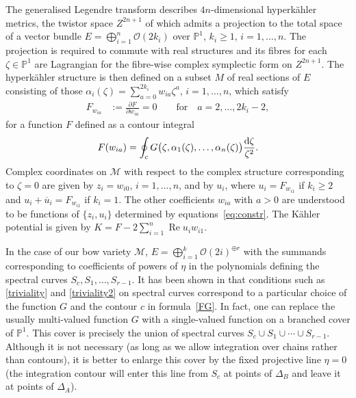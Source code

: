 \documentclass[10pt,a4paper]{amsart}
\newcommand{\re}{\operatorname{Re}}
\newcommand{\ol}{\overline}
\numberwithin{equation}{section}
\newcommand{\oP}{{\mathbb{P}}}
\newcommand{\sM}{{\mathcal{M}}} %
\newcommand{\sO}{{\mathcal{O}}}
\begin{document}
{ The generalised Legendre transform describes $4n$-dimensional hyperk\"ahler metrics, the twistor space $Z^{2n+1}$ of which admits a projection to the total space of a vector bundle $E=\bigoplus_{i=1}^n\sO(2k_i)$ over $\oP^1$, $k_i\geq 1$, $i=1,\dots,n$. The projection is required to commute with real structures and its fibres for each $\zeta\in \oP^1$ are Lagrangian for the fibre-wise complex symplectic form on $Z^{2n+1}$. The hyperk\"ahler structure is then defined on a subset $M$ of real sections of $E$ consisting of those $\alpha_i(\zeta)=\sum_{a=0}^{2k_i}w_{ia}\zeta^a$, $i=1,\dots, n$, which satisfy
 \begin{align}\label{eq:constr}
 F_{w_{ia}}&:=\frac{\partial F}{\partial w_{ia}}=0\qquad \text{for}\quad a=2,\dots, 2k_i-2,
 \end{align}
 for a function $F$ defined as a contour integral
 \begin{equation}
 F(w_{ia})=\oint_c G\bigl(\zeta,\alpha_1(\zeta),\dots,\alpha_n(\zeta)\bigr) \frac{{\rm d}\zeta}{\zeta^2}.\label{FG}
 \end{equation}
 Complex coordinates on $\sM$ with respect to the complex structure corresponding to $\zeta=0$ are given by $z_i=w_{i0}$, $i=1,\dots, n$, and by $u_i$, where $ u_i=F_{w_{i1}}$ if $k_i\geq 2$ and $u_i+\ol u_i=F_{w_{i1}}$ if $k_i=1$.
The other coefficients $w_{ia}$ with $a>0$ are understood to be functions of $\{z_i, u_i\}$ determined by equations~\eqref{eq:constr}.
The K\"ahler potential is given by $K=F-2\sum_{i=1}^n\re u_iw_{i1}$.

 In the case of our bow variety $\sM$, $E=\bigoplus_{i=1}^k \sO(2i)^{\oplus r}$ with the summands corresponding to coefficients of powers of $\eta$ in the polynomials defining the spectral curves $S_c,S_1,\dots,S_{r-1}$.
 It has been shown in \cite{BielGZ} that conditions such as \eqref{triviality} and
 \eqref{triviality2} on spectral curves correspond to a particular choice of the function $G$ and the contour $c$ in formula~\eqref{FG}.
 In fact, one can replace the usually multi-valued function $G$ with a single-valued function on a branched cover of $\oP^1$. This cover is precisely the union of spectral curves $S_c\cup S_1\cup\cdots\cup S_{r-1}$. Although it is not necessary (as long as we allow integration over chains rather than contours), it is better to enlarge this cover by the fixed projective line $\eta=0$ (the integration contour will enter this line from $S_c$ at points of $\Delta_B$ and leave it at points of $\Delta_A$).

}
\end{document}
